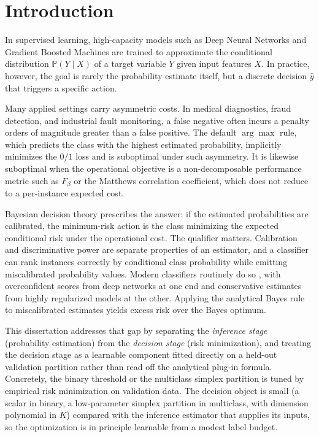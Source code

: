 \chapter{Introduction}\label{sec:intro}

In supervised learning, high-capacity models such as Deep Neural Networks and Gradient Boosted Machines are trained to approximate the conditional distribution $\mathbb{P}(Y \mid X)$ of a target variable $Y$ given input features $X$. In practice, however, the goal is rarely the probability estimate itself, but a discrete decision $\hat{y}$ that triggers a specific action.

Many applied settings carry asymmetric costs. In medical diagnostics, fraud detection, and industrial fault monitoring, a false negative often incurs a penalty orders of magnitude greater than a false positive. The default $\arg\max$ rule, which predicts the class with the highest estimated probability, implicitly minimizes the $0/1$ loss and is suboptimal under such asymmetry. It is likewise suboptimal when the operational objective is a non-decomposable performance metric such as $F_\beta$ or the Matthews correlation coefficient, which does not reduce to a per-instance expected cost.

Bayesian decision theory prescribes the answer: if the estimated probabilities are calibrated, the minimum-risk action is the class minimizing the expected conditional risk under the operational cost. The qualifier matters. Calibration and discriminative power are separate properties of an estimator, and a classifier can rank instances correctly by conditional class probability while emitting miscalibrated probability values. Modern classifiers routinely do so \citep{niculescuMizil2005predicting}, with overconfident scores from deep networks \citep{guo2017calibration} at one end and conservative estimates from highly regularized models at the other. Applying the analytical Bayes rule to miscalibrated estimates yields excess risk over the Bayes optimum.

This dissertation addresses that gap by separating the \textit{inference stage} (probability estimation) from the \textit{decision stage} (risk minimization), and treating the decision stage as a learnable component fitted directly on a held-out validation partition rather than read off the analytical plug-in formula. Concretely, the binary threshold or the multiclass simplex partition is tuned by empirical risk minimization on validation data. The decision object is small (a scalar in binary, a low-parameter simplex partition in multiclass, with dimension polynomial in $K$) compared with the inference estimator that supplies its inputs, so the optimization is in principle learnable from a modest label budget.

